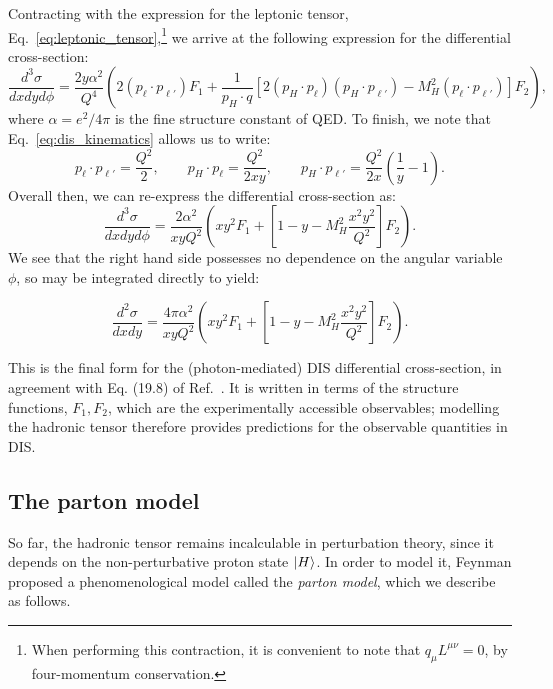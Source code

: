 \documentclass[withindex,glossary]{cam-thesis}
\begin{document}
Contracting with the expression for the leptonic tensor, Eq.~\eqref{eq:leptonic_tensor},\footnote{When performing this contraction, it is convenient to note that $q_{\mu} L^{\mu\nu} = 0$, by four-momentum conservation.} we arrive at the following expression for the differential cross-section:
\begin{equation}
\frac{d^3\sigma}{dx dy d\phi} = \frac{2y \alpha^2}{Q^4} \left( 2(p_{\ell} \cdot p_{\ell'}) F_1 + \frac{1}{p_H \cdot q} [2 (p_H \cdot p_{\ell}) (p_H \cdot p_{\ell'}) - M_H^2 (p_{\ell} \cdot p_{\ell'})] F_2 \right),
\end{equation}
where $\alpha = e^2 / 4\pi$ is the fine structure constant of QED. To finish, we note that Eq.~\eqref{eq:dis_kinematics} allows us to write:
\begin{equation}
p_{\ell} \cdot p_{\ell'} = \frac{Q^2}{2}, \qquad p_H \cdot p_{\ell} = \frac{Q^2}{2xy}, \qquad p_H \cdot p_{\ell'} = \frac{Q^2}{2x} \left( \frac{1}{y} - 1 \right). 
\end{equation}
Overall then, we can re-express the differential cross-section as:
\begin{equation}
\frac{d^3\sigma}{dx dy d\phi} = \frac{2\alpha^2}{xy Q^2} \left(xy^2F_1 + \left[1 - y - M_H^2 \frac{x^2y^2}{Q^2}\right] F_2\right).
\end{equation}
We see that the right hand side possesses no dependence on the angular variable $\phi$, so may be integrated directly to yield:
\begin{framed}
\begin{equation}
\frac{d^2\sigma}{dx dy} = \frac{4\pi\alpha^2}{xy Q^2} \left(xy^2F_1 + \left[1 - y - M_H^2 \frac{x^2y^2}{Q^2}\right] F_2 \right).
\end{equation}
\end{framed}
This is the final form for the (photon-mediated) DIS differential cross-section, in agreement with Eq. (19.8) of Ref.~\cite{ParticleDataGroup:2022pth}. It is written in terms of the structure functions, $F_1, F_2$, which are the experimentally accessible observables; modelling the hadronic tensor therefore provides predictions for the observable quantities in DIS.


\subsection{The parton model}
So far, the hadronic tensor remains incalculable in perturbation theory, since it depends on the non-perturbative proton state $\ket{H}$. In order to model it, Feynman proposed a phenomenological model called the \textit{parton model}, which we describe as follows. 
\end{document}
